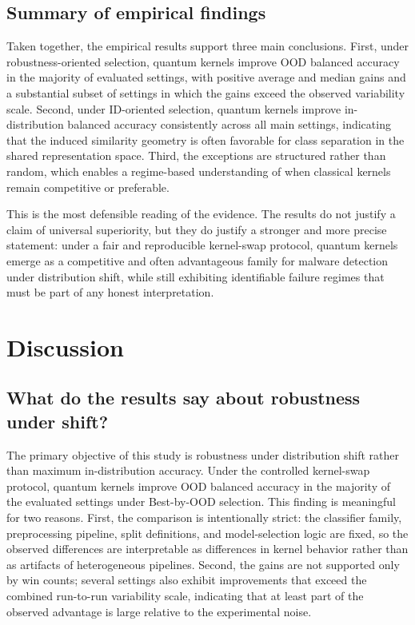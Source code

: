 \documentclass[pdflatex,sn-mathphys-num]{sn-jnl}%
\theoremstyle{thmstyleone}%
\theoremstyle{thmstyletwo}%
\theoremstyle{thmstylethree}%
\begin{document}
\subsection{Summary of empirical findings}

Taken together, the empirical results support three main conclusions. First, under robustness-oriented selection, quantum kernels improve OOD balanced accuracy in the majority of evaluated settings, with positive average and median gains and a substantial subset of settings in which the gains exceed the observed variability scale. Second, under ID-oriented selection, quantum kernels improve in-distribution balanced accuracy consistently across all main settings, indicating that the induced similarity geometry is often favorable for class separation in the shared representation space. Third, the exceptions are structured rather than random, which enables a regime-based understanding of when classical kernels remain competitive or preferable.

This is the most defensible reading of the evidence. The results do not justify a claim of universal superiority, but they do justify a stronger and more precise statement: under a fair and reproducible kernel-swap protocol, quantum kernels emerge as a competitive and often advantageous family for malware detection under distribution shift, while still exhibiting identifiable failure regimes that must be part of any honest interpretation.

\section{Discussion}
\label{sec:discussion}

\subsection{What do the results say about robustness under shift?}

The primary objective of this study is robustness under distribution shift rather than maximum in-distribution accuracy. Under the controlled kernel-swap protocol, quantum kernels improve OOD balanced accuracy in the majority of the evaluated settings under Best-by-OOD selection. This finding is meaningful for two reasons. First, the comparison is intentionally strict: the classifier family, preprocessing pipeline, split definitions, and model-selection logic are fixed, so the observed differences are interpretable as differences in kernel behavior rather than as artifacts of heterogeneous pipelines. Second, the gains are not supported only by win counts; several settings also exhibit improvements that exceed the combined run-to-run variability scale, indicating that at least part of the observed advantage is large relative to the experimental noise.
\end{document}
